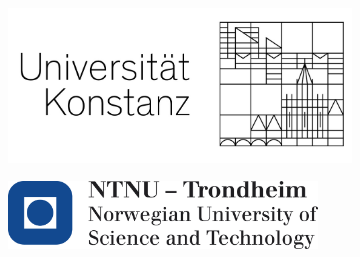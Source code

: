 \documentclass[twoside,a4paper]{article}
\begin{document}
\begin{figure}[H]
    \centering
    \begin{subfigure}{0.45\textwidth}
        \includegraphics[width=.8\textwidth]{Ressources/UniKn.png}
    \end{subfigure}\hspace*{0.1\textwidth}
    \begin{subfigure}{0.45\textwidth}
        \includegraphics[width=0.9\textwidth]{Ressources/ntnu.png}
        \vspace*{12pt}
    \end{subfigure}
\end{figure}
\newpage

 
\vspace*{7pt}
\newpage


    \tableofcontents
    \thispagestyle{empty}	
    \setcounter{page}{1}
\end{document}
